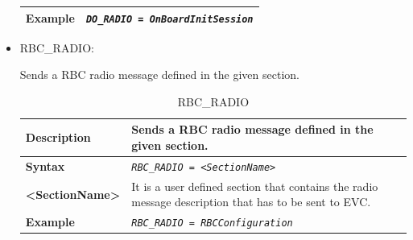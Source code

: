 \begin{itemize}
\begin{longtable}{|l|l|}
				\hline

					\begin{minipage}[t]{0.22\linewidth} \textbf{Example} \end{minipage}
				&	\begin{minipage}[t]{0.78\linewidth}	\emph{\texttt{DO\_RADIO = OnBoardInitSession}} \end{minipage} \\

				\hline \hline

			\end{longtable}

		\item RBC\_RADIO:

			Sends a RBC radio message defined in the given section.

			\begin{longtable}{|l|l|l|}
				\caption{RBC\_RADIO}\\
				\hline

					\begin{minipage}[t]{0.22\linewidth} \textbf{Description} \end{minipage}
				&	\begin{minipage}[t]{0.78\linewidth} Sends a RBC radio message defined in the given section. \end{minipage} \\

				\hline

					\begin{minipage}[t]{0.22\linewidth} \textbf{Syntax}	\end{minipage}
				&	\multicolumn{2}{l|}{ \begin{minipage}[t]{0.78\linewidth} \emph{\texttt{RBC\_RADIO = <SectionName>}} \end{minipage} } \\

				\hline

					\begin{minipage}[t]{0.22\linewidth} \textbf{<SectionName>} \end{minipage}
				&	\multicolumn{2}{l|}{ \begin{minipage}[t]{0.78\linewidth} It is a user defined section that contains the radio message description that has to be sent to EVC. \end{minipage} } \\

				\hline

					\begin{minipage}[t]{0.22\linewidth} \textbf{Example} \end{minipage}
				&	\multicolumn{2}{l|}{ \begin{minipage}[t]{0.78\linewidth} \emph{\texttt{RBC\_RADIO = RBCConfiguration}} \end{minipage} } \\


\end{longtable}
\end{itemize}
